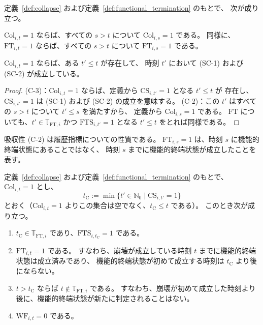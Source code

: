 \begin{proposition}[機能的終端指標と崩壊指標の基本性質]
\label{prop:collapse_basic}
定義~\ref{def:collapse} および定義~\ref{def:functional_termination} のもとで、
次が成り立つ。
\begin{description}[style=nextline]
  \item[(C-2) 吸収性]
  $\mathrm{Col}_{i,t}=1$ ならば、すべての $s>t$ について $\mathrm{Col}_{i,s}=1$ である。
  同様に、$\mathrm{FT}_{i,t}=1$ ならば、すべての $s>t$ について $\mathrm{FT}_{i,s}=1$ である。
  \item[(C-3) 崩壊状態成立時刻の存在]
  $\mathrm{Col}_{i,t}=1$ ならば、ある $t'\leq t$ が存在して、
  時刻 $t'$ において (SC-1) および (SC-2) が成立している。
\end{description}
\end{proposition}

\begin{proof}
(C-3)：$\mathrm{Col}_{i,t}=1$ ならば、定義から $\mathrm{CS}_{i,t'}=1$ となる $t'\leq t$ が
存在し、$\mathrm{CS}_{i,t'}=1$ は (SC-1) および (SC-2) の成立を意味する。
(C-2)：この $t'$ はすべての $s>t$ について $t'\leq s$ を満たすから、
定義から $\mathrm{Col}_{i,s}=1$ である。
$\mathrm{FT}$ についても、$t'\in\mathbb{T}_{\mathrm{FT},i}$ かつ $\mathrm{FTS}_{i,t'}=1$ となる
$t'\leq t$ をとれば同様である。
\end{proof}

吸収性 (C-2) は履歴指標についての性質である。
$\mathrm{FT}_{i,s}=1$ は、時刻 $s$ に機能的終端状態にあることではなく、
時刻 $s$ までに機能的終端状態が成立したことを表す。

\begin{proposition}[機能的終端と崩壊の順序および崩壊後の整形式実現]
\label{prop:termination_order}
定義~\ref{def:collapse} および定義~\ref{def:functional_termination} のもとで、
$\mathrm{Col}_{i,t}=1$ とし、
\[
  t_{\mathrm{C}} := \min\{t'\in\mathbb{N}_0 \mid \mathrm{CS}_{i,t'}=1\}
\]
とおく（$\mathrm{Col}_{i,t}=1$ よりこの集合は空でなく、$t_{\mathrm{C}}\leq t$ である）。
このとき次が成り立つ。
\begin{enumerate}[label=(\roman*)]
  \item $t_{\mathrm{C}}\in\mathbb{T}_{\mathrm{FT},i}$ であり、$\mathrm{FTS}_{i,t_{\mathrm{C}}}=1$ である。
  \item $\mathrm{FT}_{i,t}=1$ である。
  すなわち、崩壊が成立している時刻 $t$ までに機能的終端状態は成立済みであり、
  機能的終端状態が初めて成立する時刻は $t_{\mathrm{C}}$ より後にならない。
  \item $t>t_{\mathrm{C}}$ ならば $t\notin\mathbb{T}_{\mathrm{FT},i}$ である。
  すなわち、崩壊が初めて成立した時刻より後に、機能的終端状態が新たに判定されることはない。
  \item $\mathrm{WF}_{i,t}=0$ である。
\end{enumerate}
\end{proposition}

